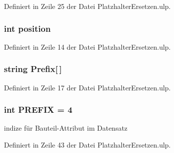 Definiert in Zeile 25 der Datei Platzhalter\+Ersetzen.\+ulp.

\hypertarget{_platzhalter_ersetzen_8ulp_a401e942526aac47cef94f478182486e7}{}
\subsubsection[{position}]{\setlength{\rightskip}{0pt plus 5cm}int position}\label{_platzhalter_ersetzen_8ulp_a401e942526aac47cef94f478182486e7}


Definiert in Zeile 14 der Datei Platzhalter\+Ersetzen.\+ulp.

\hypertarget{_platzhalter_ersetzen_8ulp_aadcab157eddcbfbc94bcde5363c32934}{}
\subsubsection[{Prefix}]{\setlength{\rightskip}{0pt plus 5cm}string Prefix\mbox{[}$\,$\mbox{]}}\label{_platzhalter_ersetzen_8ulp_aadcab157eddcbfbc94bcde5363c32934}


Definiert in Zeile 17 der Datei Platzhalter\+Ersetzen.\+ulp.

\hypertarget{_platzhalter_ersetzen_8ulp_a12efc69ea4176b0f4db6e857cb7f0756}{}
\subsubsection[{P\+R\+E\+F\+I\+X}]{\setlength{\rightskip}{0pt plus 5cm}int P\+R\+E\+F\+I\+X = 4}\label{_platzhalter_ersetzen_8ulp_a12efc69ea4176b0f4db6e857cb7f0756}


indize für Bauteil-\/\+Attribut im Datensatz 



Definiert in Zeile 43 der Datei Platzhalter\+Ersetzen.\+ulp.

\hypertarget{_platzhalter_ersetzen_8ulp_a92031faa8b6be9bafd0fcc7bf1f22bb2}{}

